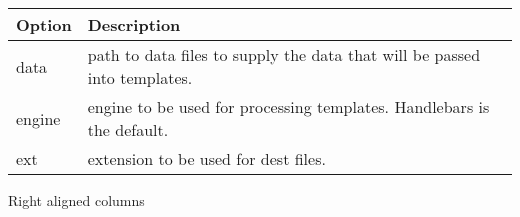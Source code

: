\documentclass[]{article}
\begin{document}
\begin{longtable}[]{@{}ll@{}}
\toprule
\begin{minipage}[b]{0.09\columnwidth}\raggedright\strut
Option\strut
\end{minipage} & \begin{minipage}[b]{0.16\columnwidth}\raggedright\strut
Description\strut
\end{minipage}\tabularnewline
\midrule
\endhead
\begin{minipage}[t]{0.09\columnwidth}\raggedright\strut
data\strut
\end{minipage} & \begin{minipage}[t]{0.16\columnwidth}\raggedright\strut
path to data files to supply the data that will be passed into
templates.\strut
\end{minipage}\tabularnewline
\begin{minipage}[t]{0.09\columnwidth}\raggedright\strut
engine\strut
\end{minipage} & \begin{minipage}[t]{0.16\columnwidth}\raggedright\strut
engine to be used for processing templates. Handlebars is the
default.\strut
\end{minipage}\tabularnewline
\begin{minipage}[t]{0.09\columnwidth}\raggedright\strut
ext\strut
\end{minipage} & \begin{minipage}[t]{0.16\columnwidth}\raggedright\strut
extension to be used for dest files.\strut
\end{minipage}\tabularnewline
\bottomrule
\end{longtable}

Right aligned columns
\end{document}
